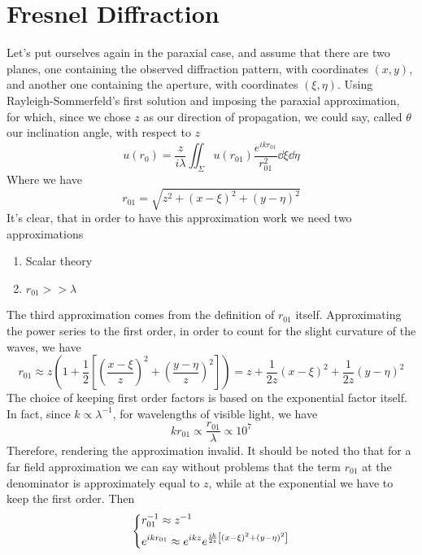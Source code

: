 \documentclass[../electromagnetism.tex]{subfiles}
\begin{document}
\section{Fresnel Diffraction}
Let's put ourselves again in the paraxial case, and assume that there are two planes, one containing the observed diffraction pattern, with coordinates $(x,y)$, and another one containing the aperture, with coordinates $(\xi,\eta)$. Using Rayleigh-Sommerfeld's first solution and imposing the paraxial approximation, for which, since we chose $z$ as our direction of propagation, we could say, called $\theta$ our inclination angle, with respect to $z$
\begin{equation*}
	u(r_0)=\frac{z}{i\lambda}\iint_{\Sigma}u(r_{01})\frac{e^{ikr_{01}}}{r_{01}^2}\dd{\xi}\dd{\eta}
\end{equation*}
Where we have
\begin{equation}
	r_{01}=\sqrt{z^2+(x-\xi)^2+(y-\eta)^2}
	\label{eq:ro1.huydiff}
\end{equation}
It's clear, that in order to have this approximation work we need two approximations
\begin{enumerate}
\item Scalar theory
\item $r_{01}>>\lambda$
\end{enumerate}
The third approximation comes from the definition of $r_{01}$ itself. Approximating the power series to the first order, in order to count for the slight curvature of the waves, we have
\begin{equation}
	r_{01}\approx z\left( 1+\frac{1}{2}\left[ \left( \frac{x-\xi}{z} \right)^2+\left( \frac{y-\eta}{z} \right)^2 \right] \right)=z+\frac{1}{2z}\left( x-\xi \right)^2+\frac{1}{2z}\left( y-\eta \right)^2
	\label{eq:fresnelapprox}
\end{equation}
The choice of keeping first order factors is based on the exponential factor itself. In fact, since $k\propto\lambda^{-1}$, for wavelengths of visible light, we have
\begin{equation*}
	kr_{01}\propto\frac{r_{01}}{\lambda}\propto10^7
\end{equation*}
Therefore, rendering the approximation invalid. It should be noted tho that for a far field approximation we can say without problems that the term $r_{01}$ at the denominator is approximately equal to $z$, while at the exponential we have to keep the first order. Then
\begin{equation*}
	\begin{dcases}
		r_{01}^{-1}\approx z^{-1}\\
		e^{ikr_{01}}\approx e^{ikz}e^{\frac{ik}{2z}\left[ (x-\xi)^2+(y-\eta)^2 \right]}
	\end{dcases}
\end{equation*}
\end{document}
